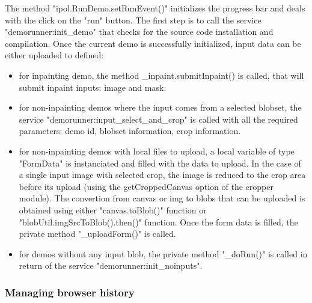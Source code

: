 The method "ipol.RunDemo.setRunEvent()" initializes the progress bar and deals
with the click on the "run" button.
The first step is to call the service "demorunner:init\_demo" that checks for the
source code installation and compilation. Once the current demo is successfully
initialized, input data can be either uploaded to defined:
\begin{itemize}
 \item for inpainting demo, the method \_inpaint.submitInpaint() is called,
        that will submit inpaint inputs: image and mask.
 \item for non-inpainting demos where the input comes from a selected blobset,
        the service "demorunner:input\_select\_and\_crop" is called with all the
        required parameters: demo id, blobset information, crop information.
 \item for non-inpainting demos with local files to upload, a local variable
        of type "FormData" is instanciated and filled with the data to upload.
        In the case of a single input image with selected crop, the image
        is reduced to the crop area before its upload (using the getCroppedCanvas
        option of the cropper module). The convertion from canvas or img to 
        blobs that can be uploaded is obtained using either "canvas.toBlob()"
        function or "blobUtil.imgSrcToBlob().then()" function. Once the 
        form data is filled, the private method "\_uploadForm()" is called.
 \item for demos without any input blob, the private method "\_doRun()" is
        called in return of the service "demorunner:init\_noinputs".
\end{itemize}


\subsubsection{Managing browser history}

